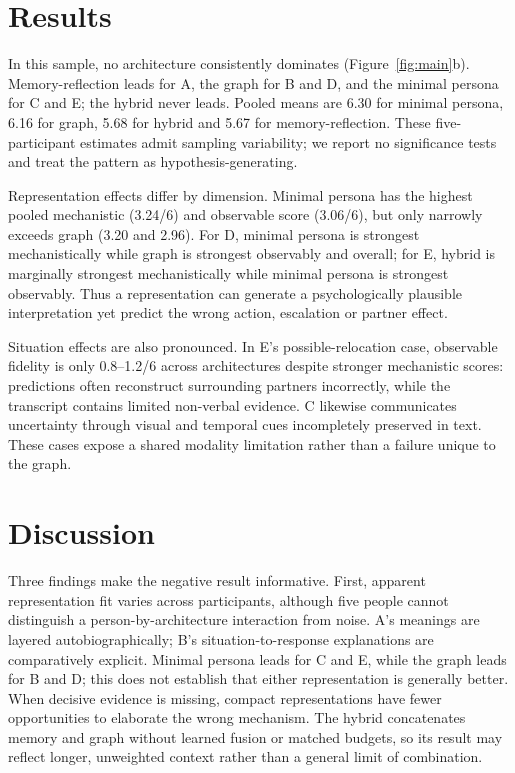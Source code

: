 \documentclass{article}
\begin{document}
\section{Results}

In this sample, no architecture consistently dominates (Figure~\ref{fig:main}b). Memory-reflection
leads for A, the graph for B and D, and the minimal persona for C and E; the hybrid never leads.
Pooled means are 6.30 for minimal persona, 6.16 for graph, 5.68 for hybrid and 5.67 for
memory-reflection. These five-participant estimates admit sampling variability; we report no
significance tests and treat the pattern as hypothesis-generating.

Representation effects differ by dimension. Minimal persona has the highest pooled mechanistic
(3.24/6) and observable score (3.06/6), but only narrowly exceeds graph (3.20 and 2.96). For D,
minimal persona is strongest mechanistically while graph is strongest observably and overall; for E,
hybrid is marginally strongest mechanistically while minimal persona is strongest observably. Thus
a representation can generate a psychologically plausible interpretation yet predict the wrong
action, escalation or partner effect.

Situation effects are also pronounced. In E's possible-relocation case, observable fidelity is only
0.8--1.2/6 across architectures despite stronger mechanistic scores: predictions often reconstruct
surrounding partners incorrectly, while the transcript contains limited non-verbal evidence. C
likewise communicates uncertainty through visual and temporal cues incompletely preserved in
text. These cases expose a shared modality limitation rather than a failure unique to the graph.

\section{Discussion}

Three findings make the negative result informative. First, apparent representation fit varies across
participants, although five people cannot distinguish a person-by-architecture interaction from
noise. A's meanings are layered autobiographically; B's situation-to-response explanations are
comparatively explicit. Minimal persona leads for C and E, while the graph leads for B and D;
this does not establish that either representation is generally better. When decisive evidence is
missing, compact representations have fewer opportunities to elaborate the wrong mechanism.
The hybrid concatenates memory and graph without learned fusion or matched budgets, so its
result may reflect longer, unweighted context rather than a general limit of combination.
\end{document}
